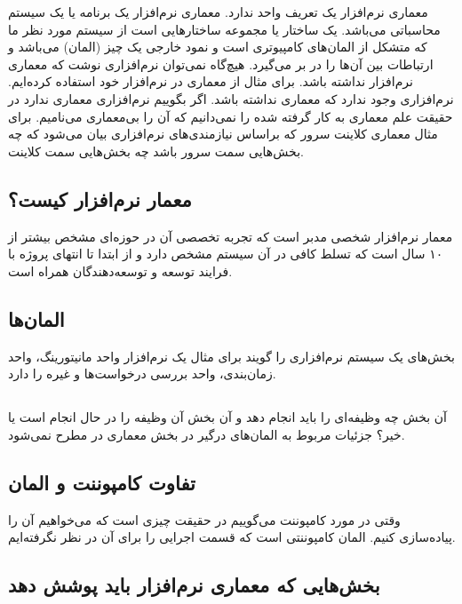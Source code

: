 \documentclass[a4paper]{article}
\begin{document}
معماری نرم‌افزار یک تعریف واحد ندارد. معماری نرم‌افزار یک برنامه یا یک سیستم
محاسباتی می‌باشد. یک ساختار یا مجموعه ساختار‌هایی است از سیستم مورد نظر ما که
متشکل از المان‌های کامپیوتری است و نمود خارجی یک چیز (المان) می‌باشد و ارتباطات
بین آن‌ها را در بر می‌گیرد. هیچ‌گاه نمی‌توان نرم‌افزاری نوشت که معماری نرم‌افزار
نداشته باشد. برای مثال از معماری  در نرم‌افزار خود استفاده کرده‌ایم.
نرم‌افزاری وجود ندارد که معماری نداشته باشد. اگر بگوییم نرم‌افزاری معماری ندارد
در حقیقت علم معماری به کار گرفته شده را نمی‌دانیم که آن را بی‌معماری می‌نامیم.
برای مثال معماری کلاینت سرور که براساس نیازمندی‌های نرم‌افزاری بیان می‌شود که چه
بخش‌هایی سمت سرور باشد چه‌ بخش‌هایی سمت کلاینت.

\subsection{معمار نرم‌افزار کیست؟}

معمار نرم‌افزار شخصی مدبر است که تجربه تخصصی آن در حوزه‌ای مشخص بیشتر از ۱۰ سال
است که تسلط کافی در آن سیستم مشخص دارد و از ابتدا تا انتهای پروژه با فرایند
توسعه و توسعه‌دهندگان همراه است.

\subsection{المان‌ها}

بخش‌های یک سیستم نرم‌افزاری را گویند برای مثال یک نرم‌افزار واحد مانیتورینگ،
واحد زمان‌بندی، واحد بررسی درخواست‌ها و غیره را دارد.

\subsection{}

آن بخش چه وظیفه‌ای را باید انجام دهد و آن بخش آن وظیفه را در حال انجام است یا
خیر؟ جزئیات مربوط به المان‌های درگیر در بخش معماری در  مطرح نمی‌شود.

\subsection{تفاوت کامپوننت و المان}

وقتی در مورد کامپوننت می‌گوییم در حقیقت چیزی است که می‌خواهیم آن را پیاده‌سازی
کنیم. المان کامپوننتی است که قسمت اجرایی را برای آن در نظر نگرفته‌ایم.

\subsection{بخش‌هایی که معماری نرم‌افزار باید پوشش دهد}
\end{document}
